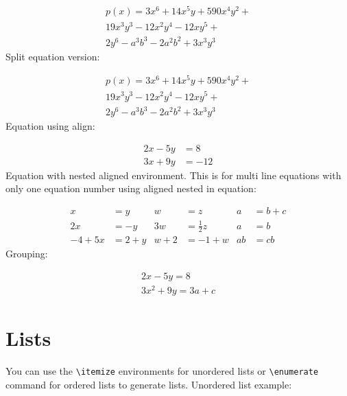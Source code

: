 \begin{multline}
p(x) = 3x^6 + 14x^5y + 590x^4y^2 + \\
  19x^3y^3 - 12x^2y^4 - 12xy^5 + \\
  2y^6 - a^3b^3 - 2a^2b^2 + 3x^3y^3
\end{multline}
Split equation version:

\begin{equation}
\begin{split}
p(x) = 3x^6 + 14x^5y + 590x^4y^2 + \\
19x^3y^3 - 12x^2y^4 - 12xy^5 + \\
2y^6 - a^3b^3 - 2a^2b^2 + 3x^3y^3
\end{split}
\end{equation}
Equation using align:

\begin{align*}
2x - 5y &=  8 \\
3x + 9y &=  -12
\end{align*}
Equation with nested aligned environment. This is for multi line equations with only one equation number using aligned nested in equation:

\begin{equation} \label{nested_eqn}
\begin{aligned}
x&=y           &  w &=z              &  a&=b+c\\
2x&=-y         &  3w&=\frac{1}{2}z   &  a&=b\\
-4 + 5x&=2+y   &  w+2&=-1+w          &  ab&=cb
\end{aligned}
\end{equation}
\filbreak %
Grouping:

\begin{gather*}
2x - 5y =  8 \\
3x^2 + 9y =  3a + c
\end{gather*}

\section{Lists}\label{sec:lists}
You can use the \texttt{\textbackslash{itemize}} environments for unordered lists or \texttt{\textbackslash{enumerate}} command for ordered lists to generate lists.
Unordered list example:\noskip

